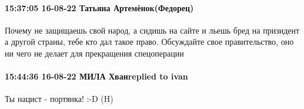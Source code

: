  
 
 
 
 

\paragraph{15:37:05 16-08-22 Татьяна Артемёнок(Федорец)}

Почему не защищаешь свой народ, а сидишь на сайте и льешь бред на призидент а
другой страны, тебе кто дал такое право. Обсуждайте свое правительство, оно ни
чего не делает для прекращения спецоперации

\paragraph{15:44:36 16-08-22 МИЛА Хванreplied to ivan}

Ты нацист - портянка! :-D (H) 🤣😂😆






